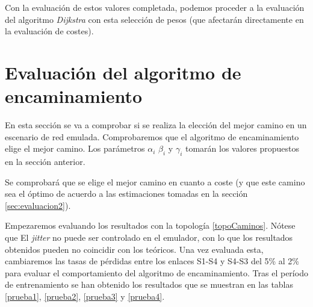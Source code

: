 \documentclass[a4paper,11pt]{book}
\begin{document}
Con la evaluación de estos valores completada, podemos proceder a la evaluación del algoritmo \textit{Dijkstra} con esta selección de pesos (que afectarán directamente en la evaluación de costes).

%
%
\section{Evaluación del algoritmo de encaminamiento} \label{sec:evaluacion3}

En esta sección se va a comprobar si se realiza la elección del mejor camino en un escenario de red emulada. Comprobaremos que el algoritmo de encaminamiento elige el mejor camino. Los parámetros $\alpha_i$ $\beta_i$ y $\gamma_i$ tomarán los valores propuestos en la sección anterior.

Se comprobará que se elige el mejor camino en cuanto a coste (y que este camino sea el óptimo de acuerdo a las estimaciones tomadas en la sección \ref{sec:evaluacion2}).

Empezaremos evaluando los resultados con la topología \ref{topoCaminos}. Nótese que El \textit{jitter} no puede ser controlado en el emulador, con lo que los resultados obtenidos pueden no coincidir con los teóricos. Una vez evaluada esta, cambiaremos las tasas de pérdidas entre los enlaces S1-S4 y S4-S3 del 5\% al 2\% para evaluar el comportamiento del algoritmo de encaminamiento. Tras el período de entrenamiento se han obtenido los resultados que se muestran en las tablas \ref{prueba1}, \ref{prueba2}, \ref{prueba3} y \ref{prueba4}.
 
\end{document}
